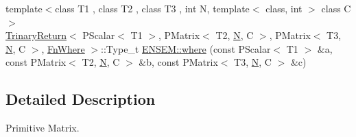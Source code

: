 \begin{DoxyCompactItemize}
{\footnotesize template$<$class T1 , class T2 , class T3 , int N, template$<$ class, int $>$ class C$>$ }\\\mbox{\hyperlink{structTrinaryReturn}{Trinary\+Return}}$<$ P\+Scalar$<$ T1 $>$, P\+Matrix$<$ T2, \mbox{\hyperlink{adat__devel_2lib_2hadron_2operator__name__util_8cc_a7722c8ecbb62d99aee7ce68b1752f337}{N}}, C $>$, P\+Matrix$<$ T3, \mbox{\hyperlink{adat__devel_2lib_2hadron_2operator__name__util_8cc_a7722c8ecbb62d99aee7ce68b1752f337}{N}}, C $>$, \mbox{\hyperlink{structFnWhere}{Fn\+Where}} $>$\+::Type\+\_\+t \mbox{\hyperlink{group__primmatrix_gacb8fae3141957f56989969c3cb8f694e}{E\+N\+S\+E\+M\+::where}} (const P\+Scalar$<$ T1 $>$ \&a, const P\+Matrix$<$ T2, \mbox{\hyperlink{adat__devel_2lib_2hadron_2operator__name__util_8cc_a7722c8ecbb62d99aee7ce68b1752f337}{N}}, C $>$ \&b, const P\+Matrix$<$ T3, \mbox{\hyperlink{adat__devel_2lib_2hadron_2operator__name__util_8cc_a7722c8ecbb62d99aee7ce68b1752f337}{N}}, C $>$ \&c)
\end{DoxyCompactItemize}


\subsection{Detailed Description}
Primitive Matrix. 

